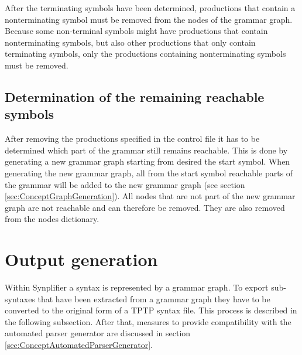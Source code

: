 After the terminating symbols have been determined, productions that contain a nonterminating symbol must be removed from the nodes of the grammar graph. Because some non-terminal symbols might have productions that contain nonterminating symbols, but also other productions that only contain terminating symbols, only the productions containing nonterminating symbols must be removed.

%

\subsection{Determination of the remaining reachable symbols}\label{sec:ConceptDerterminingRemainingReachable}

After removing the productions specified in the control file it has to be determined which part of the grammar still remains reachable.
This is done by generating a new grammar graph starting from desired the start symbol.
When generating the new grammar graph, all from the start symbol reachable parts of the grammar will be added to the new grammar graph (see section \ref{sec:ConceptGraphGeneration}).
All nodes that are not part of the new grammar graph are not reachable and can therefore be removed. They are also removed from the nodes dictionary.

\section{Output generation}\label{sec:ConceptOutputGeneration}

Within \ac{Synplifier} a syntax is represented by a grammar graph.
To export sub-syntaxes that have been extracted from a grammar graph they have to be converted to the original form of a \ac{TPTP} syntax file. This process is described in the following subsection.
After that, measures to provide compatibility with the automated parser generator are discussed in section \ref{sec:ConceptAutomatedParserGenerator}.

